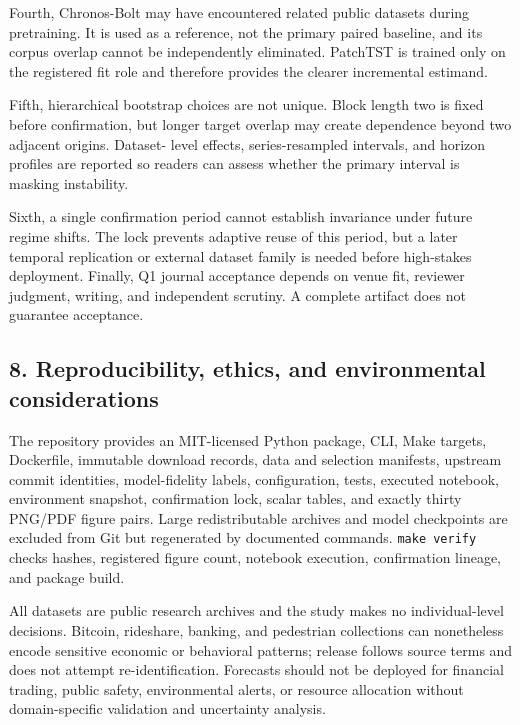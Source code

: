 \documentclass[
]{article}
\begin{document}
Fourth, Chronos-Bolt may have encountered related public datasets during
pretraining. It is used as a reference, not the primary paired baseline,
and its corpus overlap cannot be independently eliminated. PatchTST is
trained only on the registered fit role and therefore provides the
clearer incremental estimand.

Fifth, hierarchical bootstrap choices are not unique. Block length two
is fixed before confirmation, but longer target overlap may create
dependence beyond two adjacent origins. Dataset- level effects,
series-resampled intervals, and horizon profiles are reported so readers
can assess whether the primary interval is masking instability.

Sixth, a single confirmation period cannot establish invariance under
future regime shifts. The lock prevents adaptive reuse of this period,
but a later temporal replication or external dataset family is needed
before high-stakes deployment. Finally, Q1 journal acceptance depends on
venue fit, reviewer judgment, writing, and independent scrutiny. A
complete artifact does not guarantee acceptance.

\subsection{8. Reproducibility, ethics, and environmental
considerations}\label{8-reproducibility-ethics-and-environmental-considerations}

The repository provides an MIT-licensed Python package, CLI, Make
targets, Dockerfile, immutable download records, data and selection
manifests, upstream commit identities, model-fidelity labels,
configuration, tests, executed notebook, environment snapshot,
confirmation lock, scalar tables, and exactly thirty PNG/PDF figure
pairs. Large redistributable archives and model checkpoints are excluded
from Git but regenerated by documented commands. \texttt{make\ verify}
checks hashes, registered figure count, notebook execution, confirmation
lineage, and package build.

All datasets are public research archives and the study makes no
individual-level decisions. Bitcoin, rideshare, banking, and pedestrian
collections can nonetheless encode sensitive economic or behavioral
patterns; release follows source terms and does not attempt
re-identification. Forecasts should not be deployed for financial
trading, public safety, environmental alerts, or resource allocation
without domain-specific validation and uncertainty analysis.
\end{document}
